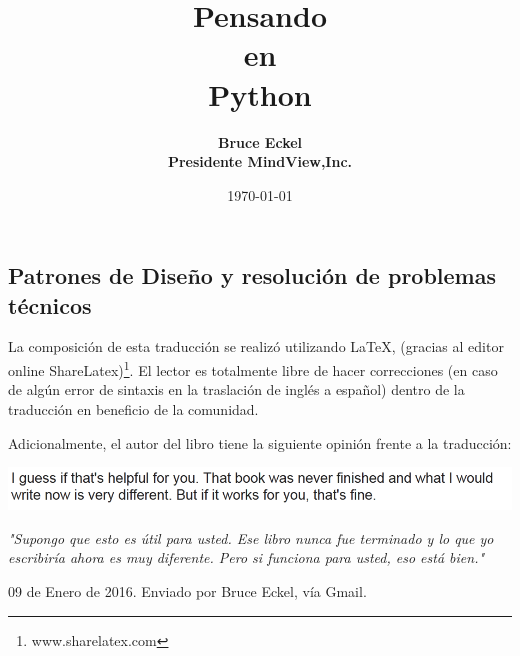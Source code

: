 \documentclass{article}
\title{\textbf{\Huge Pensando \\ \Huge en \\ \Huge  Python}}
\author{\textbf{\large Bruce Eckel} \\ \textbf{Presidente MindView,Inc.}}
\date{\large \today}
\begin{document}
\maketitle

\begin{center}

\subsection*{\large Patrones de Diseño y resolución de problemas técnicos}


\end{center}
\newpage

\tableofcontents

\newpage

La composición de esta traducción se realizó utilizando \LaTeX, (gracias al editor online ShareLatex)\footnote{www.sharelatex.com}. El lector es totalmente libre de hacer correcciones (en caso de algún error de sintaxis en la traslación de inglés a español) dentro de la traducción en beneficio de la comunidad.
\newline

Adicionalmente, el autor del libro tiene la siguiente opinión frente a la traducción:

\vspace{0.6cm}

\includegraphics[width=\textwidth]{Words}

\textit{ "Supongo que esto es útil para usted. Ese libro nunca fue terminado y lo que yo escribiría ahora es muy diferente. Pero si funciona para usted, eso está bien."  }   

\begin{flushright}
09 de Enero de 2016. Enviado por Bruce Eckel, vía Gmail.
\end{flushright}

\vspace{0.5cm}
\end{document}
